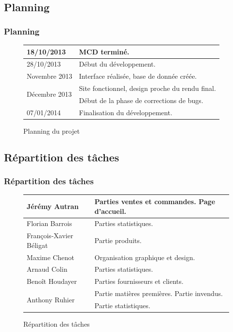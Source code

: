 \subsection{Planning}
\begin{frame}
\frametitle{Planning}
\begin{center}
\begin{figure}[h!]
    \centering
    \begin{tabular}{|l|l|}
        \hline
        18/10/2013 & MCD terminé. \\
        \hline
        28/10/2013 & Début du développement. \\
        \hline
        Novembre 2013 & Interface réalisée, base de donnée créée. \\
        \hline
        \multirow{2}{*}{Décembre 2013}
            & Site fonctionnel, design proche du rendu final. \\
            & Début de la phase de corrections de bugs. \\
        \hline
        07/01/2014 & Finalisation du développement. \\
        \hline
    \end{tabular}
    \caption{Planning du projet}
\end{figure}
\end{center}
\end{frame}

\subsection{Répartition des tâches}
{
\logo{}
\begin{frame}
\frametitle{Répartition des tâches}
\begin{center}
\begin{figure}[h!]
    \centering
    \begin{tabular}{|l|l|}
        \hline
            Jérémy Autran & Parties ventes et commandes. Page d'accueil.\\
        \hline
            Florian Barrois & Parties statistiques. \\
        \hline
            François-Xavier Béligat & Partie produits. \\
        \hline
            Maxime Chenot & Organisation graphique et design. \\
        \hline
            Arnaud Colin & Parties statistiques. \\
        \hline
            Benoît Houdayer & Parties fournisseurs et clients. \\
        \hline
            \multirow{2}{*}{Anthony Ruhier} & Partie matières premières. Partie
            invendus.\\
            & Partie statistiques.\\
        \hline
    \end{tabular}
    \caption{Répartition des tâches}
\end{figure}
\end{center}
\end{frame}
}


